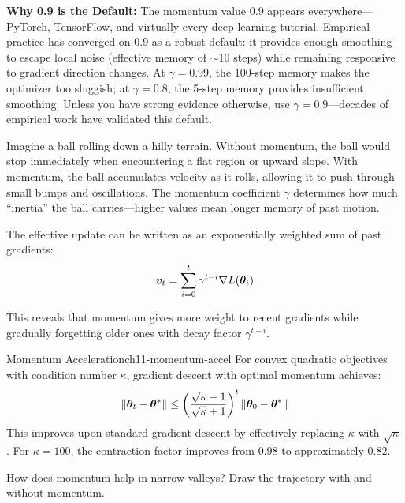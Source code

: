 \documentclass[../../main.tex]{subfiles}
\begin{document}
\begin{important}
\textbf{Why 0.9 is the Default:} The momentum value 0.9 appears everywhere---PyTorch, TensorFlow, and virtually every deep learning tutorial. Empirical practice has converged on 0.9 as a robust default: it provides enough smoothing to escape local noise (effective memory of $\sim$10 steps) while remaining responsive to gradient direction changes. At $\gamma=0.99$, the 100-step memory makes the optimizer too sluggish; at $\gamma=0.8$, the 5-step memory provides insufficient smoothing. Unless you have strong evidence otherwise, use $\gamma = 0.9$---decades of empirical work have validated this default.
\end{important}

\begin{intuition}
Imagine a ball rolling down a hilly terrain. Without momentum, the ball would stop immediately when encountering a flat region or upward slope. With momentum, the ball accumulates velocity as it rolls, allowing it to push through small bumps and oscillations. The momentum coefficient $\gamma$ determines how much ``inertia'' the ball carries---higher values mean longer memory of past motion.
\end{intuition}

The effective update can be written as an exponentially weighted sum of past gradients:
\[
    \boldsymbol{v}_t = \sum_{i=0}^{t} \gamma^{t-i} \nabla L(\boldsymbol{\theta}_i)
\]

This reveals that momentum gives more weight to recent gradients while gradually forgetting older ones with decay factor $\gamma^{t-i}$.

\begin{theorem}{Momentum Acceleration}{ch11-momentum-accel}
For convex quadratic objectives with condition number $\kappa$, gradient descent with optimal momentum achieves:
\[
    \left\lVert \boldsymbol{\theta}_t - \boldsymbol{\theta}^* \right\rVert \leq \left(\frac{\sqrt{\kappa} - 1}{\sqrt{\kappa} + 1}\right)^t \left\lVert \boldsymbol{\theta}_0 - \boldsymbol{\theta}^* \right\rVert
\]
This improves upon standard gradient descent by effectively replacing $\kappa$ with $\sqrt{\kappa}$. For $\kappa = 100$, the contraction factor improves from $0.98$ to approximately $0.82$.
\end{theorem}

\begin{checkpoint}
How does momentum help in narrow valleys? Draw the trajectory with and without momentum.
\end{checkpoint}
\end{document}
